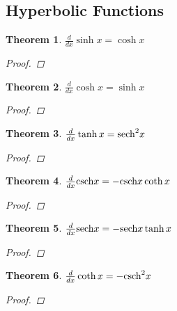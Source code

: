 \documentclass[10pt]{report}
\newtheorem{thm3}{Theorem}[subsection]
\newcommand{\csch}{\textup{csch}}
\newcommand{\sech}{\textup{sech}}
\begin{document}
\subsection{Hyperbolic Functions}
\begin{thm3}
$\frac{d}{dx}\sinh x=\cosh x$
\begin{proof}

\end{proof}
\end{thm3}
\begin{thm3}
$\frac{d}{dx}\cosh x=\sinh x$
\begin{proof}

\end{proof}
\end{thm3}
\begin{thm3}
$\frac{d}{dx}\tanh x = \sech^{2}x$
\begin{proof}

\end{proof}
\end{thm3}
\begin{thm3}
$\frac{d}{dx}\csch x = -\csch x \coth x$
\begin{proof}

\end{proof}
\end{thm3}
\begin{thm3}
$\frac{d}{dx}\sech x=- \sech x\tanh x$
\begin{proof}

\end{proof}
\end{thm3}
\begin{thm3}
$\frac{d}{dx}\coth x=-\csch^2x$
\begin{proof}

\end{proof}
\end{thm3}
\end{document}
